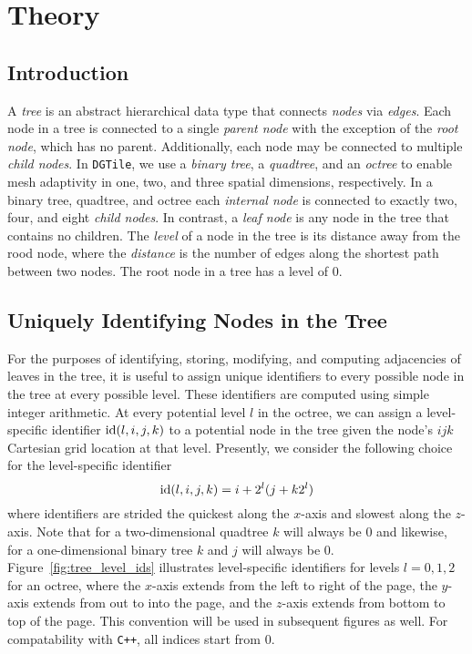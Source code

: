 \section{Theory}

\subsection{Introduction}

A \emph{tree} is an abstract hierarchical data type that connects \emph{nodes}
via \emph{edges}. Each node in a tree is connected to a single \emph{parent
node} with the exception of the \emph{root node}, which has no parent.
Additionally, each node may be connected to multiple \emph{child nodes}.
In \texttt{DGTile}, we use a \emph{binary tree}, a \emph{quadtree}, and an
\emph{octree} to enable mesh adaptivity in one, two, and three spatial
dimensions, respectively. In a binary tree, quadtree, and octree each
\emph{internal node} is connected to exactly two, four, and eight \emph{child
nodes}. In contrast, a \emph{leaf node} is any node in the tree that contains
no children. The \emph{level} of a node in the tree is its distance away from
the rood node, where the \emph{distance} is the number of edges along the
shortest path between two nodes. The root node in a tree has a level of $0$.

\subsection{Uniquely Identifying Nodes in the Tree}



For the purposes of identifying, storing, modifying, and computing adjacencies
of leaves in the tree, it is useful to assign unique identifiers to every
possible node in the tree at every possible level. These identifiers are
computed using simple integer arithmetic. At every potential level $l$ in the
octree, we can assign a level-specific identifier $\text{id}(l,i,j,k)$ to a
potential node in the tree given the node's $ijk$ Cartesian grid location
at that level. Presently, we consider the following choice for the
level-specific identifier
%
\begin{equation}
\text{id}(l,i,j,k) = i + 2^l(j + k 2^l)
\end{equation}
%
where identifiers are strided the quickest along the $x$-axis and slowest
along the $z$-axis. Note that for a two-dimensional quadtree $k$ will always
be $0$ and likewise, for a one-dimensional binary tree $k$ and $j$ will always
be $0$. Figure~\ref{fig:tree_level_ids} illustrates level-specific identifiers
for levels $l=0,1,2$ for an octree, where the $x$-axis extends from the left to
right of the page, the $y$-axis extends from out to into the page, and the
$z$-axis extends from bottom to top of the page. This convention will be used
in subsequent figures as well. For compatability with \texttt{C++}, all indices
start from $0$.

